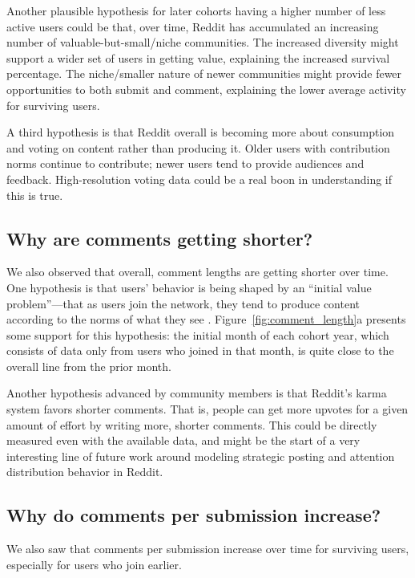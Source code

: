 \documentclass[10pt, oneside, onecolumn]{article}
\begin{document}
Another plausible hypothesis for later cohorts having a higher number of less active users could be that, over time, Reddit has accumulated an increasing number of valuable-but-small/niche communities.  The increased diversity might support a wider set of users in getting value, explaining the increased survival percentage.  The niche/smaller nature of newer communities might provide fewer opportunities to both submit and comment, explaining the lower average activity for surviving users. 

A third hypothesis is that Reddit overall is becoming more about consumption and voting on content rather than producing it.  Older users with contribution norms continue to contribute; newer users tend to provide audiences and feedback.  High-resolution voting data could be a real boon in understanding if this is true.

\subsection{Why are comments getting shorter?}

We also observed that overall, comment lengths are getting shorter over time.  
One hypothesis is that users' behavior is being shaped by an ``initial value problem''---that as users join the network, they tend to produce content according to the norms of what they see \cite{Kooti2010, Danescu-niculescu-mizil2013}.  
Figure~\ref{fig:comment_length}a presents some support for this hypothesis: the initial month of each cohort year, which consists of data only from users who joined in that month, is quite close to the overall line from the prior month.  

Another hypothesis advanced by community members\cite{RedditHypo1} is that Reddit's karma system favors shorter comments.  That is, people can get more upvotes for a given amount of effort by writing more, shorter comments.  This could be directly measured even with the available data, and might be the start of a very interesting line of future work around modeling strategic posting and attention distribution behavior in Reddit. 

\subsection{Why do comments per submission increase?}

We also saw that comments per submission increase over time for surviving users, especially for users who join earlier.
\end{document}
